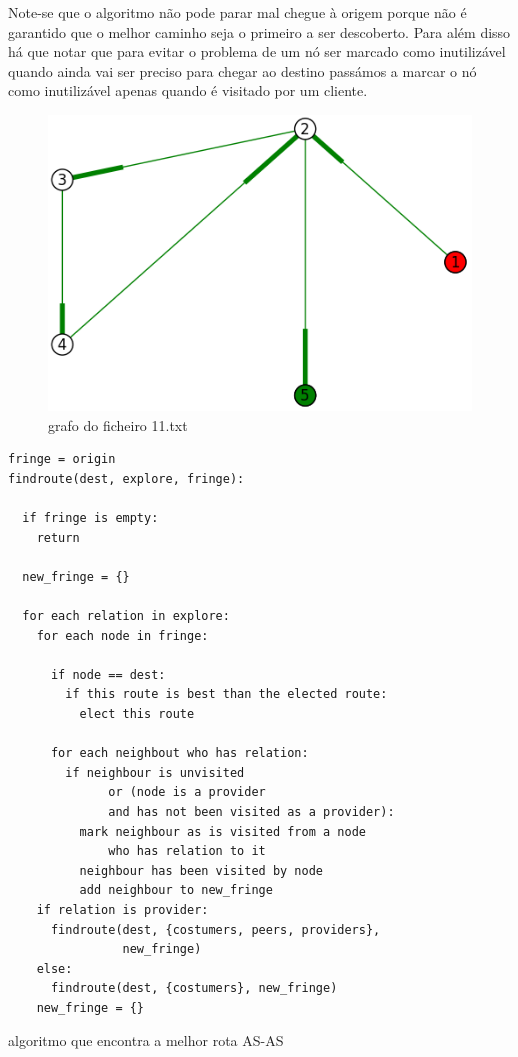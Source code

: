 \documentclass[10pt,a4paper]{article}
\begin{document}
Note-se que o algoritmo não pode parar mal chegue à origem porque não é garantido que o melhor caminho seja o primeiro a ser descoberto. Para além disso há que notar que para evitar o problema de um nó ser marcado como inutilizável quando ainda vai ser preciso para chegar ao destino passámos a marcar o nó como inutilizável apenas quando é visitado por um cliente.

\begin{figure}[h]
\centering
\includegraphics[scale=0.5]{11}
\caption{grafo do ficheiro 11.txt}
\label{fig:11}
\end{figure}

\begin{algorithm}
\begin{lstlisting}
fringe = origin
findroute(dest, explore, fringe):

  if fringe is empty:
    return

  new_fringe = {}

  for each relation in explore:
    for each node in fringe:

      if node == dest:
        if this route is best than the elected route:
          elect this route

      for each neighbout who has relation:
        if neighbour is unvisited
              or (node is a provider
              and has not been visited as a provider):
          mark neighbour as is visited from a node
              who has relation to it
          neighbour has been visited by node
          add neighbour to new_fringe
    if relation is provider:
      findroute(dest, {costumers, peers, providers},
                new_fringe)
    else:
      findroute(dest, {costumers}, new_fringe)
    new_fringe = {}
\end{lstlisting}
\caption{algoritmo que encontra a melhor rota AS-AS}
\label{algo:findroute}
\end{algorithm}
\end{document}
